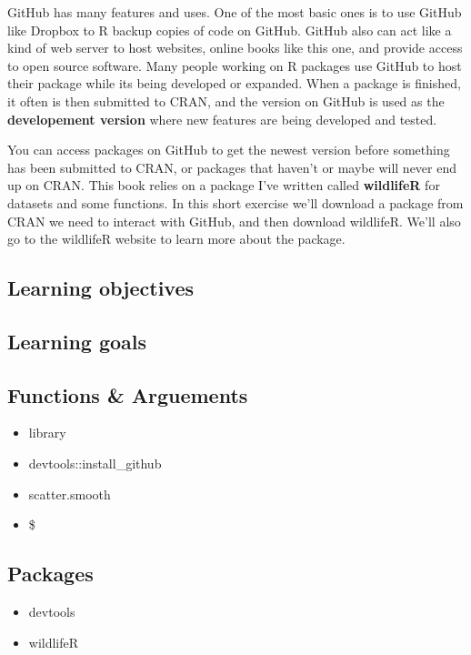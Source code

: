 \documentclass[]{book}
\providecommand{\tightlist}{%
  \setlength{\itemsep}{0pt}\setlength{\parskip}{0pt}}
\theoremstyle{definition}
\theoremstyle{definition}
\theoremstyle{definition}
\theoremstyle{remark}
\begin{document}
GitHub has many features and uses. One of the most basic ones is to use
GitHub like Dropbox to R backup copies of code on GitHub. GitHub also
can act like a kind of web server to host websites, online books like
this one, and provide access to open source software. Many people
working on R packages use GitHub to host their package while its being
developed or expanded. When a package is finished, it often is then
submitted to CRAN, and the version on GitHub is used as the
\textbf{developement version} where new features are being developed and
tested.

You can access packages on GitHub to get the newest version before
something has been submitted to CRAN, or packages that haven't or maybe
will never end up on CRAN. This book relies on a package I've written
called \textbf{wildlifeR} for datasets and some functions. In this short
exercise we'll download a package from CRAN we need to interact with
GitHub, and then download wildlifeR. We'll also go to the wildlifeR
website to learn more about the package.

\subsection{Learning objectives}\label{learning-objectives-1}

\subsection{Learning goals}\label{learning-goals-1}

\subsection{Functions \& Arguements}\label{functions-arguements-1}

\begin{itemize}
\tightlist
\item
  library
\item
  devtools::install\_github
\item
  scatter.smooth
\item
  \$
\end{itemize}

\subsection{Packages}\label{packages-2}

\begin{itemize}
\tightlist
\item
  devtools
\item
  wildlifeR
\end{itemize}
\end{document}
